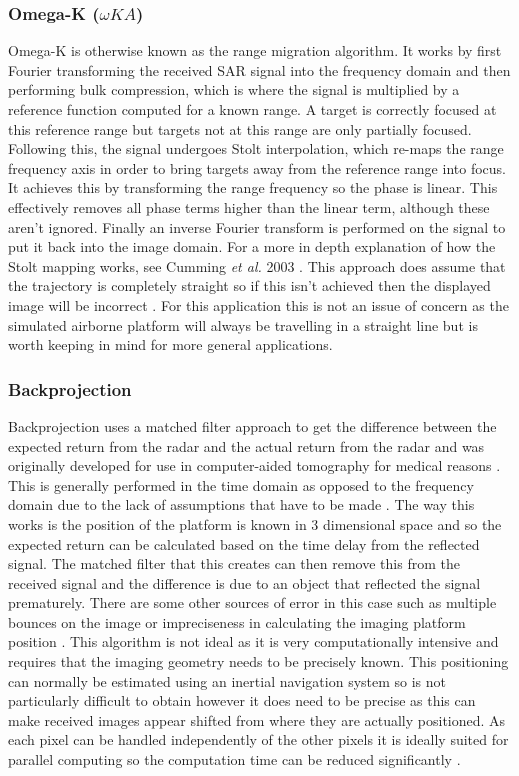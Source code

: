 \subsubsection{Omega-K ($\omega KA$)}
Omega-K is otherwise known as the range migration algorithm. It works by first Fourier transforming the received SAR signal into the frequency domain and then performing bulk compression, which is where the signal is multiplied by a reference function computed for a known range. A target is correctly focused at this reference range but targets not at this range are only partially focused. Following this, the signal undergoes Stolt interpolation, which re-maps the range frequency axis in order to bring targets away from the reference range into focus. It achieves this by transforming the range frequency so the phase is linear. This effectively removes all phase terms higher than the linear term, although these aren't ignored. Finally an inverse Fourier transform is performed on the signal to put it back into the image domain. For a more in depth explanation of how the Stolt mapping works, see Cumming \textit{et al.} 2003 \cite[section~3]{cummingInterpretationsOmegaKAlgorithm2003}. This approach does assume that the trajectory is completely straight so if this isn't achieved then the displayed image will be incorrect \cite{albuquerqueApplicationsTimeDomainBackProjection}. For this application this is not an issue of concern as the simulated airborne platform will always be travelling in a straight line but is worth keeping in mind for more general applications.
\subsubsection{Backprojection}
Backprojection uses a matched filter approach to get the difference between the expected return from the radar and the actual return from the radar and was originally developed for use in computer-aided tomography for medical reasons \cite{naComparisonBackProjectionRange2006}. This is generally performed in the time domain as opposed to the frequency domain due to the lack of assumptions that have to be made \cite{albuquerqueApplicationsTimeDomainBackProjection}. The way this works is the position of the platform is known in 3 dimensional space and so the expected return can be calculated based on the time delay from the reflected signal. The matched filter that this creates can then remove this from the received signal and the difference is due to an object that reflected the signal prematurely. There are some other sources of error in this case such as multiple bounces on the image or impreciseness in calculating the imaging platform position \cite{duerschBackprojectionSyntheticAperture2013}. This algorithm is not ideal as it is very computationally intensive and requires that the imaging geometry needs to be precisely known. This positioning can normally be estimated using an inertial navigation system so is not particularly difficult to obtain however it does need to be precise as this can make received images appear shifted from where they are actually positioned. As each pixel can be handled independently of the other pixels it is ideally suited for parallel computing so the computation time can be reduced significantly \cite{albuquerqueApplicationsTimeDomainBackProjection}.
